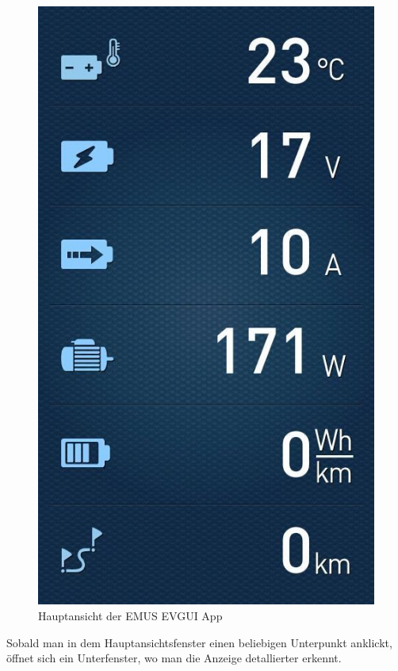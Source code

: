 \begin{figure}[H]
	\begin{center}
		\includegraphics[scale=0.5]{figures/Akku/EMUSAPP1.jpg}
		\caption{Hauptansicht der EMUS EVGUI App}
	\end{center}
\end{figure}

\newpage

Sobald man in dem Hauptansichtsfenster einen beliebigen Unterpunkt anklickt, öffnet sich ein Unterfenster, wo man die Anzeige detallierter erkennt.

